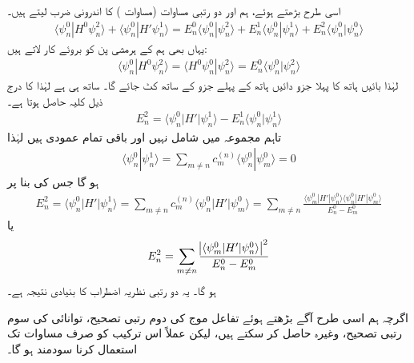  اسی طرح بڑھتے ہوئے، ہم  اور دو رتبی مساوات (مساوات ) کا اندرونی ضرب لیتے ہیں۔
\begin{align*}
\langle \psi_n^0 | H^0 \psi_n^2 \rangle + \langle \psi_n^0 | H' \psi_n^1 \rangle = E_n^0 \langle \psi_n^0 | \psi_n^2 \rangle + E_n^1 \langle \psi_n^0 | \psi_n^1 \rangle + E_n^2 \langle \psi_n^0 | \psi_n^0 \rangle
\end{align*}
یہاں بھی ہم  کے ہرمشی پن کو بروئے کار لاتے ہیں: 
\begin{align*}
\langle \psi_n^0 | H^0 \psi_n^2 \rangle = \langle H^0 \psi_n^0 | \psi_n^2 \rangle = E_n^0 \langle \psi_n^0 | \psi_n^2 \rangle
\end{align*}
 لہٰذا بائیں ہاتھ کا پہلا جزو دائیں ہاتھ کے پہلے جزو کے ساتھ کٹ جائے گا۔ ساتھ ہی  ہے لہٰذا  کا درج ذیل کلیہ حاصل ہوتا ہے۔
\begin{align}\label{مساوات_غیر_مضطرب_دوم_رتبی_تصحیح}
E_n^2 = \langle \psi_n^0 | H' | \psi_n^1 \rangle - E_n^1 \langle \psi_n^0 | \psi_n^1 \rangle
\end{align}
تاہم مجموعہ میں  شامل نہیں اور باقی تمام عمودی ہیں لہٰذا 
\begin{align*}
\langle \psi_n^0 | \psi_n^1 \rangle = \sum_{m \ne n} c_m^{(n)} \langle \psi_n^0 | \psi_m^0 \rangle = 0
\end{align*}
 ہو گا جس کی بنا پر 
\begin{align*}
E_n^2 = \langle \psi_n^0 | H' | \psi_n^1 \rangle = \sum_{m \ne n} c_m^{(n)} \langle \psi_n^0 | H' | \psi_m^0 \rangle = \sum_{m \ne n} \frac{\langle \psi_m^0 | H' | \psi_n^0 \rangle \langle \psi_n^0 | H' | \psi_m^0 \rangle }{E_n^0 - E_m^0}
\end{align*}
یا 
\begin{align}\label{مساوات_غیر_اضطراب_دوم_رتبی_نتیجہ}
E_n^2 = \sum_{m \ne n} \frac{ \abs{ \langle \psi_m^0 | H' | \psi_n^0\rangle }^2 }{E_n^0 - E_m^0}
\end{align}
 ہو گا۔ یہ دو رتبی نظریہ اضطراب کا بنیادی نتیجہ ہے۔

 اگرچہ ہم اسی طرح آگے بڑھتے ہوئے تفاعل موج  کی دوم رتبی تصحیح، توانائی کی سوم رتبی تصحیح، وغیرہ حاصل کر سکتے ہیں، لیکن عملاً اس ترکیب کو صرف مساوات  تک استعمال کرنا سودمند ہو گا۔
 
